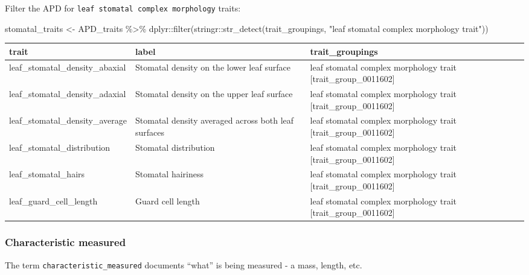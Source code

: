 \documentclass[
  letterpaper,
  DIV=11,
  numbers=noendperiod]{scrartcl}
\newenvironment{Shaded}{\begin{snugshade}}{\end{snugshade}}
\newcommand{\FunctionTok}[1]{\textcolor[rgb]{0.28,0.35,0.67}{#1}}
\newcommand{\NormalTok}[1]{\textcolor[rgb]{0.00,0.23,0.31}{#1}}
\newcommand{\OtherTok}[1]{\textcolor[rgb]{0.00,0.23,0.31}{#1}}
\newcommand{\SpecialCharTok}[1]{\textcolor[rgb]{0.37,0.37,0.37}{#1}}
\newcommand{\StringTok}[1]{\textcolor[rgb]{0.13,0.47,0.30}{#1}}
\begin{document}
\pagebreak

Filter the APD for \texttt{leaf\ stomatal\ complex\ morphology} traits:

\begin{Shaded}
\begin{Highlighting}[]
\NormalTok{stomatal\_traits }\OtherTok{\textless{}{-}} 
\NormalTok{  APD\_traits }\SpecialCharTok{\%\textgreater{}\%}
\NormalTok{  dplyr}\SpecialCharTok{::}\FunctionTok{filter}\NormalTok{(stringr}\SpecialCharTok{::}\FunctionTok{str\_detect}\NormalTok{(trait\_groupings, }
                                    \StringTok{"leaf stomatal complex morphology trait"}\NormalTok{))}
\end{Highlighting}
\end{Shaded}

\begin{tabular}[t]{>{\raggedright\arraybackslash}p{6cm}>{\raggedright\arraybackslash}p{4cm}>{\raggedright\arraybackslash}p{5cm}}
\toprule
trait & label & trait\_groupings\\
\midrule
leaf\_stomatal\_density\_abaxial & Stomatal density on the lower leaf surface & leaf stomatal complex morphology trait [trait\_group\_0011602]\\
leaf\_stomatal\_density\_adaxial & Stomatal density on the upper leaf surface & leaf stomatal complex morphology trait [trait\_group\_0011602]\\
leaf\_stomatal\_density\_average & Stomatal density averaged across both leaf surfaces & leaf stomatal complex morphology trait [trait\_group\_0011602]\\
leaf\_stomatal\_distribution & Stomatal distribution & leaf stomatal complex morphology trait [trait\_group\_0011602]\\
leaf\_stomatal\_hairs & Stomatal hairiness & leaf stomatal complex morphology trait [trait\_group\_0011602]\\
\addlinespace
leaf\_guard\_cell\_length & Guard cell length & leaf stomatal complex morphology trait [trait\_group\_0011602]\\
\bottomrule
\end{tabular}

\pagebreak

\hypertarget{characteristic-measured}{%
\subsubsection{Characteristic measured}\label{characteristic-measured}}

The term \texttt{characteristic\_measured} documents ``what'' is being
measured - a mass, length, etc.
\end{document}

